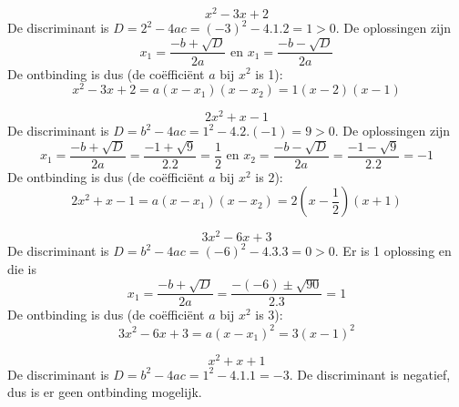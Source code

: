 \begin{voorbeeld}
	\begin{equation*}
	x^2-3x+2
	\end{equation*}
	De discriminant is $D=2^2-4ac=(-3)^2-4.1.2=1>0$. De oplossingen zijn
	\begin{equation*}
	x_1=\frac{-b+\sqrt{D}}{2a} \text{ en } x_1=\frac{-b-\sqrt{D}}{2a}
	\end{equation*}
De ontbinding is dus (de co\"effici\"ent $a$ bij $x^2$ is 1):
\begin{equation*}
x^2-3x+2=a(x-x_1)(x-x_2)=1(x-2)(x-1)
\end{equation*}
\end{voorbeeld}
\begin{voorbeeld}
\begin{equation*}
2x^2+x-1
\end{equation*}
De discriminant is $D=b^2-4ac=1^2-4.2.(-1)=9>0$. De oplossingen zijn
\begin{equation*}
x_1 = \frac{-b + \sqrt{D}}{2a}=\frac{-1+\sqrt{9}}{2.2}=\frac{1}{2} \text{ en } x_2 = \frac{-b - \sqrt{D}}{2a}=\frac{-1-\sqrt{9}}{2.2}=-1
\end{equation*}
De ontbinding is dus (de co\"effici\"ent $a$ bij $x^2$ is $2$):
\begin{equation*}
2x^2+x-1=a(x-x_1)(x-x_2)=2(x-\frac{1}{2})(x+1)
\end{equation*}
\end{voorbeeld}
\begin{voorbeeld}
\begin{equation*}
3x^2-6x+3
\end{equation*}
	De discriminant is $D=b^2-4ac=(-6)^2-4.3.3=0>0$. Er is 1 oplossing en die is
	\begin{equation*}
	x_1 = \frac{-b + \sqrt{D}}{2a}=\frac{-(-6)\pm\sqrt{90}}{2.3}=1
	\end{equation*}
De ontbinding is dus (de co\"effici\"ent $a$ bij $x^2$ is 3):
\begin{equation*}
3x^2-6x+3 = a(x-x_1)^2=3(x-1)^2
\end{equation*}
\end{voorbeeld}
\begin{voorbeeld}
	\begin{equation*}
	x^2+x+1
	\end{equation*}
	De discriminant is $D=b^2-4ac=1^2-4.1.1=-3$. De discriminant is negatief, dus is er geen ontbinding mogelijk.
\end{voorbeeld}


